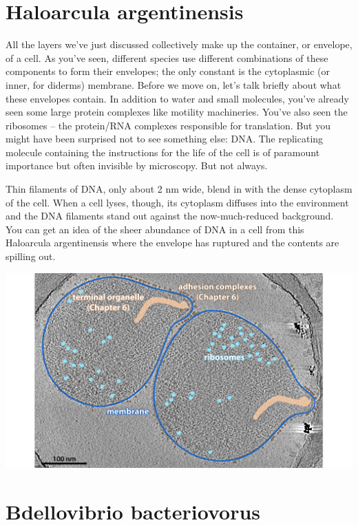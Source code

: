 \documentclass[]{tufte-book}
\begin{document}
\section{Haloarcula argentinensis}\label{haloarcula-argentinensis}

All the layers we've just discussed collectively make up the container,
or envelope, of a cell. As you've seen, different species use different
combinations of these components to form their envelopes; the only
constant is the cytoplasmic (or inner, for diderms) membrane. Before we
move on, let's talk briefly about what these envelopes contain. In
addition to water and small molecules, you've already seen some large
protein complexes like motility machineries. You've also seen the
ribosomes -- the protein/RNA complexes responsible for translation. But
you might have been surprised not to see something else: DNA. The
replicating molecule containing the instructions for the life of the
cell is of paramount importance but often invisible by microscopy. But
not always.

Thin filaments of DNA, only about 2 nm wide, blend in with the dense
cytoplasm of the cell. When a cell lyses, though, its cytoplasm diffuses
into the environment and the DNA filaments stand out against the
now-much-reduced background. You can get an idea of the sheer abundance
of DNA in a cell from this Haloarcula argentinensis where the envelope
has ruptured and the contents are spilling out.

\includegraphics{img/02_static/2_1_Mgenitalium}

\section{Bdellovibrio bacteriovorus}\label{bdellovibrio-bacteriovorus}
\end{document}
